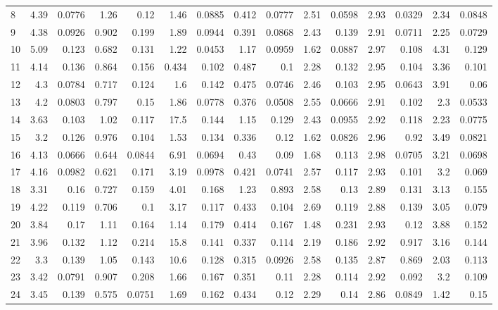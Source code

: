 \begin{longtable}{l rr rr rr rr rr rr rr}
8 & 4.39 & {0.0776} & 1.26 & {0.12} & 1.46 & {0.0885} & 0.412 & {0.0777} & 2.51 & {0.0598} & 2.93 & {0.0329} & 2.34 & {0.0848}\\
9 & 4.38 & {0.0926} & 0.902 & {0.199} & 1.89 & {0.0944} & 0.391 & {0.0868} & 2.43 & {0.139} & 2.91 & {0.0711} & 2.25 & {0.0729}\\
10 & 5.09 & {0.123} & 0.682 & {0.131} & 1.22 & {0.0453} & 1.17 & {0.0959} & 1.62 & {0.0887} & 2.97 & {0.108} & 4.31 & {0.129}\\
11 & 4.14 & {0.136} & 0.864 & {0.156} & 0.434 & {0.102} & 0.487 & {0.1} & 2.28 & {0.132} & 2.95 & {0.104} & 3.36 & {0.101}\\
12 & 4.3 & {0.0784} & 0.717 & {0.124} & 1.6 & {0.142} & 0.475 & {0.0746} & 2.46 & {0.103} & 2.95 & {0.0643} & 3.91 & {0.06}\\
13 & 4.2 & {0.0803} & 0.797 & {0.15} & 1.86 & {0.0778} & 0.376 & {0.0508} & 2.55 & {0.0666} & 2.91 & {0.102} & 2.3 & {0.0533}\\
14 & 3.63 & {0.103} & 1.02 & {0.117} & 17.5 & {0.144} & 1.15 & {0.129} & 2.43 & {0.0955} & 2.92 & {0.118} & 2.23 & {0.0775}\\
15 & 3.2 & {0.126} & 0.976 & {0.104} & 1.53 & {0.134} & 0.336 & {0.12} & 1.62 & {0.0826} & 2.96 & {0.92} & 3.49 & {0.0821}\\
16 & 4.13 & {0.0666} & 0.644 & {0.0844} & 6.91 & {0.0694} & 0.43 & {0.09} & 1.68 & {0.113} & 2.98 & {0.0705} & 3.21 & {0.0698}\\
17 & 4.16 & {0.0982} & 0.621 & {0.171} & 3.19 & {0.0978} & 0.421 & {0.0741} & 2.57 & {0.117} & 2.93 & {0.101} & 3.2 & {0.069}\\
18 & 3.31 & {0.16} & 0.727 & {0.159} & 4.01 & {0.168} & 1.23 & {0.893} & 2.58 & {0.13} & 2.89 & {0.131} & 3.13 & {0.155}\\
19 & 4.22 & {0.119} & 0.706 & {0.1} & 3.17 & {0.117} & 0.433 & {0.104} & 2.69 & {0.119} & 2.88 & {0.139} & 3.05 & {0.079}\\
20 & 3.84 & {0.17} & 1.11 & {0.164} & 1.14 & {0.179} & 0.414 & {0.167} & 1.48 & {0.231} & 2.93 & {0.12} & 3.88 & {0.152}\\
21 & 3.96 & {0.132} & 1.12 & {0.214} & 15.8 & {0.141} & 0.337 & {0.114} & 2.19 & {0.186} & 2.92 & {0.917} & 3.16 & {0.144}\\
22 & 3.3 & {0.139} & 1.05 & {0.143} & 10.6 & {0.128} & 0.315 & {0.0926} & 2.58 & {0.135} & 2.87 & {0.869} & 2.03 & {0.113}\\
23 & 3.42 & {0.0791} & 0.907 & {0.208} & 1.66 & {0.167} & 0.351 & {0.11} & 2.28 & {0.114} & 2.92 & {0.092} & 3.2 & {0.109}\\
24 & 3.45 & {0.139} & 0.575 & {0.0751} & 1.69 & {0.162} & 0.434 & {0.12} & 2.29 & {0.14} & 2.86 & {0.0849} & 1.42 & {0.15}\\
\end{longtable}
